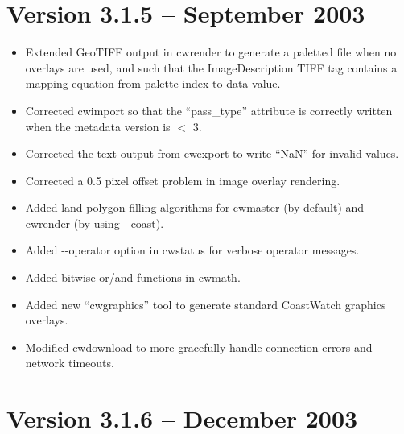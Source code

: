 
\section{Version 3.1.5 -- September 2003}

\begin{itemize}

  \item Extended GeoTIFF output in cwrender to generate a paletted
  file when no overlays are used, and such that the ImageDescription
  TIFF tag contains a mapping equation from palette index to data
  value.

  \item Corrected cwimport so that the ``pass\_type'' attribute is
  correctly written when the metadata version is $<$ 3.

  \item Corrected the text output from cwexport to write ``NaN'' for
  invalid values.

  \item Corrected a 0.5 pixel offset problem in image overlay
  rendering.

  \item Added land polygon filling algorithms for cwmaster (by
  default) and cwrender (by using -{-}coast).

  \item Added -{-}operator option in cwstatus for verbose operator
  messages.

  \item Added bitwise or/and functions in cwmath.

  \item Added new ``cwgraphics'' tool to generate standard CoastWatch
  graphics overlays.

  \item Modified cwdownload to more gracefully handle connection
  errors and network timeouts.

\end{itemize}


\section{Version 3.1.6 -- December 2003}

